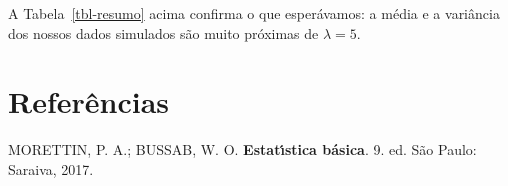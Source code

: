 \documentclass[
  portuguese,
  letterpaper,
  DIV=11,
  numbers=noendperiod]{scrartcl}
\newlength{\cslhangindent}
\newenvironment{CSLReferences}[2] %
 {\begin{list}{}{%
  \setlength{\itemindent}{0pt}
  \setlength{\leftmargin}{0pt}
  \setlength{\parsep}{0pt}
  \ifodd #1
   \setlength{\leftmargin}{\cslhangindent}
   \setlength{\itemindent}{-1\cslhangindent}
  \fi
  \setlength{\itemsep}{#2\baselineskip}}}
 {\end{list}}
\begin{document}
A Tabela~\ref{tbl-resumo} acima confirma o que esperávamos: a média e a
variância dos nossos dados simulados são muito próximas de
\(\lambda=5\).

\section*{Referências}\label{referuxeancias}

\label{refs}
\begin{CSLReferences}{0}{1}
MORETTIN, P. A.; BUSSAB, W. O. \textbf{Estat{ı́}stica b{á}sica}. 9. ed.
São Paulo: Saraiva, 2017.

\end{CSLReferences}
\end{document}
